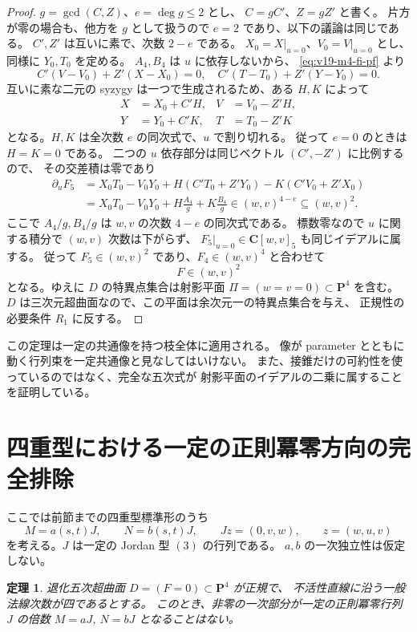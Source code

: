 \documentclass[11pt,a4paper]{ltjsarticle}
\newcommand{\CC}{\mathbf C}\newcommand{\QQ}{\mathbf Q}
\newcommand{\PP}{\mathbf P}\renewcommand{\AA}{\mathbf A}
\newtheorem{theorem}{定理}[section]
\theoremstyle{remark}\newtheorem{remark}[theorem]{注意}
\begin{document}
\begin{proof}
$g=\gcd(C,Z)$、$e=\deg g\le2$ とし、
$C=gC'$、$Z=gZ'$ と書く。
片方が零の場合も、他方を $g$ として扱うので $e=2$ であり、以下の議論は同じである。
$C',Z'$ は互いに素で、次数 $2-e$ である。
$X_0=X|_{u=0}$、$V_0=V|_{u=0}$ とし、同様に $Y_0,T_0$ を定める。
$A_4,B_4$ は $u$ に依存しないから、
\eqref{eq:v19-m4-fi-pf} より
\[
 C'(V-V_0)+Z'(X-X_0)=0,
 \quad C'(T-T_0)+Z'(Y-Y_0)=0.
\]
互いに素な二元の syzygy は一つで生成されるため、ある $H,K$ によって
\begin{align*}
 X&=X_0+C'H,&V&=V_0-Z'H,\\
 Y&=Y_0+C'K,&T&=T_0-Z'K
\end{align*}
となる。$H,K$ は全次数 $e$ の同次式で、$u$ で割り切れる。
従って $e=0$ のときは $H=K=0$ である。
二つの $u$ 依存部分は同じベクトル $(C',-Z')$ に比例するので、
その交差積は零であり
\begin{align*}
 \partial_uF_5
 &=X_0T_0-V_0Y_0
   +H(C'T_0+Z'Y_0)-K(C'V_0+Z'X_0)\\
 &=X_0T_0-V_0Y_0+H\frac{A_4}{g}+K\frac{B_4}{g}
 \in(w,v)^{4-e}\subseteq(w,v)^2.
\end{align*}
ここで $A_4/g,B_4/g$ は $w,v$ の次数 $4-e$ の同次式である。
標数零なので $u$ に関する積分で $(w,v)$ 次数は下がらず、
$F_5|_{u=0}\in\CC[w,v]_5$ も同じイデアルに属する。
従って $F_5\in(w,v)^2$ であり、$F_4\in(w,v)^4$ と合わせて
\[
                           F\in(w,v)^2
\]
となる。ゆえに $D$ の特異点集合は射影平面
$\Pi=(w=v=0)\subset\PP^4$ を含む。
$D$ は三次元超曲面なので、この平面は余次元一の特異点集合を与え、
正規性の必要条件 $R_1$ に反する。
\end{proof}

この定理は一定の共通像を持つ枝全体に適用される。
像が parameter とともに動く行列束を一定共通像と見なしてはいけない。
また、接錐だけの可約性を使っているのではなく、完全な五次式が
射影平面のイデアルの二乗に属することを証明している。


\section{四重型における一定の正則冪零方向の完全排除}
\label{sec:v19-constant-regular}

ここでは前節までの四重型標準形のうち
\[
 M=a(s,t)J,\qquad N=b(s,t)J,\qquad
 Jz=(0,v,w),\qquad z=(w,u,v)
\]
を考える。$J$ は一定の Jordan 型 $(3)$ の行列である。
$a,b$ の一次独立性は仮定しない。

\begin{theorem}\label{thm:v19-no-constant-regular}
退化五次超曲面 $D=(F=0)\subset\mathbf P^4$ が正規で、
不活性直線に沿う一般法線次数が四であるとする。
このとき、非零の一次部分が一定の正則冪零行列 $J$ の倍数
$M=aJ$, $N=bJ$ となることはない。
\end{theorem}
\end{document}
